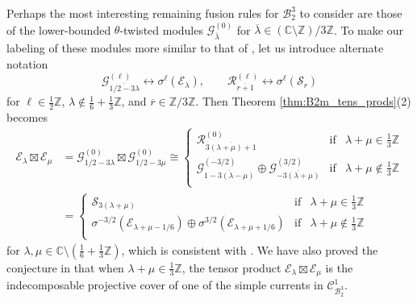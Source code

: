 \documentclass[11pt, reqno]{amsart}
\theoremstyle{definition}\newtheorem{defi}[thm]{Definition}
\theoremstyle{definition}\newtheorem{rem}[thm]{Remark}
\theoremstyle{definition}\newtheorem{exam}[thm]{Example}
\theoremstyle{definition}\newtheorem{assum}[thm]{Assumption}
\newcommand{\cB}{\mathcal{B}}
\newcommand{\cE}{\mathcal{E}}
\newcommand{\cR}{\mathcal{R}}
\newcommand{\cS}{\mathcal{S}}
\newcommand{\cC}{\mathcal{C}}
\newcommand{\cG}{\mathcal{G}}
\newcommand{\CC}{\mathbb{C}}
\newcommand{\ZZ}{\mathbb{Z}}
\newcommand{\tens}{\boxtimes}
\begin{document}
Perhaps the most interesting remaining fusion rules for $\cB_2^3$ to consider are those of the lower-bounded $\theta$-twisted modules $\cG_{\overline{\lambda}}^{(0)}$ for $\overline{\lambda}\in(\CC\setminus\ZZ)/3\ZZ$. To make our labeling of these modules more similar to that of \cite{FR}, let us introduce alternate notation
\begin{equation*}
\cG^{(\ell)}_{\overline{1/2-3\lambda}}\longleftrightarrow\sigma^\ell(\cE_\lambda),\qquad\cR_{\overline{r+1}}^{(\ell)} \longleftrightarrow\sigma^\ell(\cS_r)
\end{equation*}
for $\ell\in\frac{1}{2}\ZZ$, $\lambda\notin\frac{1}{6}+\frac{1}{3}\ZZ$, and $\overline{r}\in\ZZ/3\ZZ$. Then Theorem \ref{thm:B2m_tens_prods}(2) becomes
\begin{align*}
\cE_\lambda\tens\cE_\mu & = \cG^{(0)}_{1/2-3\lambda}\tens\cG^{(0)}_{1/2-3\mu}\cong\left\lbrace\begin{array}{lll}
\cR_{\overline{3(\lambda+\mu)+1}}^{(0)} & \text{if} & \lambda+\mu\in\frac{1}{3}\ZZ\\
\cG_{\overline{1-3(\lambda-\mu)}}^{(-3/2)}\oplus\cG_{\overline{-3(\lambda+\mu)}}^{(3/2)} & \text{if} & \lambda+\mu\notin\frac{1}{3}\ZZ\\
\end{array}\right.\nonumber\\
& = \left\lbrace\begin{array}{lll}
\cS_{3(\lambda+\mu)} & \text{if} & \lambda+\mu\in\frac{1}{3}\ZZ\\
\sigma^{-3/2}(\cE_{\lambda+\mu-1/6})\oplus\sigma^{3/2}(\cE_{\lambda+\mu+1/6}) & \text{if} & \lambda+\mu\notin\frac{1}{3}\ZZ\\
\end{array}\right.
\end{align*}
for $\lambda,\mu\in\CC\setminus(\frac{1}{6}+\frac{1}{3}\ZZ)$, which is consistent with \cite[Equation 5.40]{FR}. We have also proved the conjecture in \cite{FR} that when $\lambda+\mu\in\frac{1}{3}\ZZ$, the tensor product $\cE_\lambda\tens\cE_\mu$ is the indecomposable projective cover of one of the simple currents in $\cC^1_{\cB_2^3}$.
\end{document}
